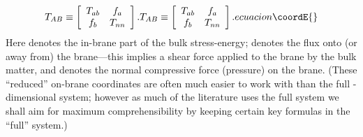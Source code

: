 \documentclass[a4paper,10pt]{article}
\begin{document}
{\begin{equation}
{T_{AB} \equiv 
\left[
\begin{array}{cc}T_{ab} & f_a\\ f_b & T_{nn} \end{array}
\right].
}{
T_{AB} \equiv 
\left[
\begin{array}{cc}T_{ab} & f_a\\ f_b & T_{nn} \end{array}
\right].
}{ecuacion}\coordE{}\end{equation}
%
Here \coordHE{} denotes the in-brane part of the bulk stress-energy;
\coordHE{} denotes the flux onto (or away from) the
brane---this implies a shear force applied to the brane by the bulk
matter, and \coordHE{} denotes the normal compressive force (pressure)
on the brane. (These ``reduced'' on-brane coordinates are often much
easier to work with than the full \coordHE{}-dimensional system; however as
much of the literature uses the full system we shall aim for maximum
comprehensibility by keeping certain key formulas in the ``full''
system.)


}
\end{document}

